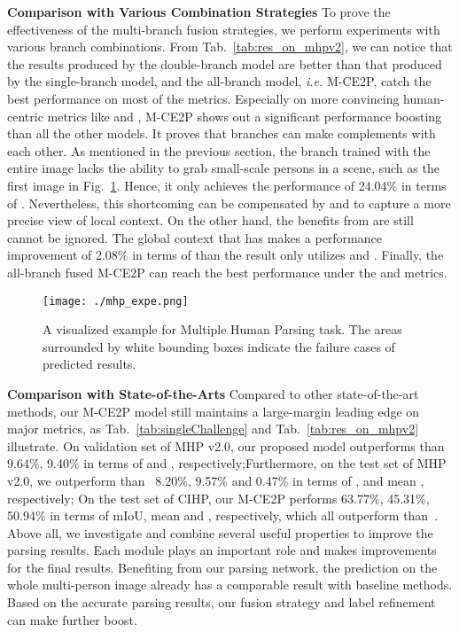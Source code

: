 \documentclass[letterpaper]{article} \usepackage{formatting-instructions-latex-2019}  \usepackage{times}  \usepackage{helvet}  \usepackage{courier}  \usepackage{url}  \usepackage{graphicx}  \frenchspacing  \setlength{\pdfpagewidth}{8.5in}  \setlength{\pdfpageheight}{11in}
\newcommand{\ie}{\emph{i.e. }}
\begin{document}
\noindent \textbf{Comparison with Various Combination Strategies}
To prove the effectiveness of the multi-branch fusion strategies, we perform experiments with various branch combinations. From Tab.~\ref{tab:res_on_mhpv2}, we can notice that the results produced by the double-branch model are better than that produced by the single-branch model, and the all-branch model, \ie M-CE2P, catch the best performance on most of the metrics. Especially on more convincing human-centric metrics like  and , M-CE2P shows out a significant performance boosting than all the other models. It proves that branches can make complements with each other. As mentioned in the previous section, the branch  trained with the entire image lacks the ability to grab small-scale persons in a scene, such as the first image in Fig.~\ref{fig:mhp_expe}. Hence, it only achieves the performance of 24.04\% in terms of . Nevertheless, this shortcoming can be compensated by  and  to capture a more precise view of local context. On the other hand, the benefits from  are still cannot be ignored. The global context that  has makes a performance improvement of 2.08\% in terms of  than the result only utilizes  and . Finally, the all-branch fused M-CE2P can reach the best performance under the  and  metrics.


\begin{figure}[t]
    \begin{center}
        \texttt{[image: ./mhp\_expe.png]}
    \end{center}
    \caption{A visualized example for Multiple Human Parsing task. The areas surrounded by white bounding boxes indicate the failure cases of predicted results.}
    \label{fig:mhp_expe}  
\end{figure}

\noindent \textbf{Comparison with State-of-the-Arts}
Compared to other state-of-the-art methods, our M-CE2P model still maintains a large-margin leading edge on major metrics, as Tab.~\ref{tab:singleChallenge} and Tab.~\ref{tab:res_on_mhpv2} illustrate. On validation set of MHP v2.0, our proposed model outperforms than~\cite{Zhao2018} 9.64\%, 9.40\% in terms of  and , respectively;Furthermore, on the test set of MHP v2.0, we outperform than~\cite{Zhao2018} 8.20\%, 9.57\% and 0.47\% in terms of ,  and mean , respectively; On the test set of CIHP, our M-CE2P performs 63.77\%, 45.31\%, 50.94\% in terms of mIoU, mean  and , respectively, which all outperform than~\cite{gong2018instance}. Above all, we investigate and combine several useful properties to improve the parsing results. Each module plays an important role and makes improvements for the final results. Benefiting from our parsing network, the prediction on the whole multi-person image already has a comparable result with baseline methods. Based on the accurate parsing results, our fusion strategy and label refinement can make further boost.
  
\end{document}
